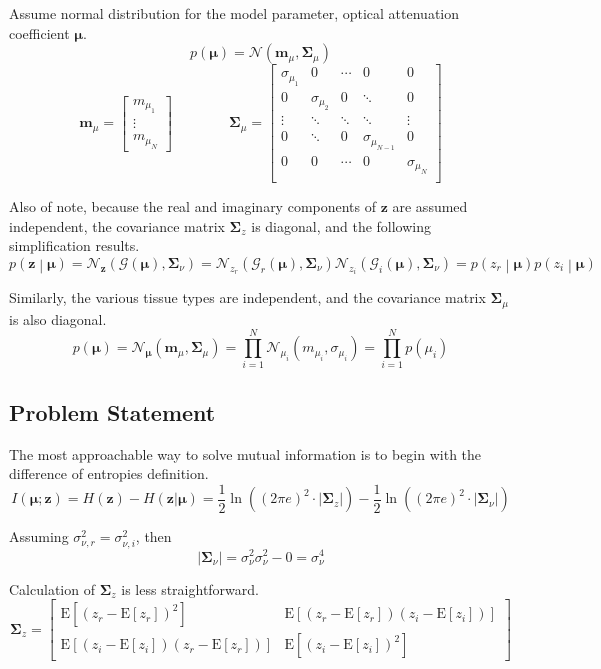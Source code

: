 \documentclass{article}         %
\theoremstyle{definition}
\theoremstyle{remark}
\newcommand{\eq}[1]{\begin{equation} #1 \end{equation}}
\newcommand{\mbf}{\mathbf{m}}
\newcommand{\zbf}{\mathbf{z}}
\newcommand{\mubf}{\boldsymbol{\mu}}
\newcommand{\Sigmabf}{\boldsymbol{\Sigma}}
\newcommand{\Gscript}{\mathcal{G}}
\newcommand{\Nscript}{\mathcal{N}}
\newcommand{\paren}[1]{\left(#1\right)}
\newcommand{\bracket}[1]{\left[#1\right]}
\newcommand{\arr}[2]{\begin{array}{#1} #2 \end{array}}
\newcommand{\brkarray}[2]{\bracket{\arr{#1}{#2}}}
\newcommand{\expect}[1]{\mathrm{E}\left[#1\right]}
\newcommand{\prodin}{\prod\limits_{i=1}^N}
\newcommand{\qq}{\qquad\qquad}
\begin{document}
Assume normal distribution for the model parameter, optical attenuation coefficient $\mubf$.
\eq{p\paren{\mubf} = \mathcal{N}\left(\mbf_\mu,\mathbf{\Sigma}_\mu\right)}
\eq{\mbf_\mu = \brkarray{c}{m_{\mu_1} \\ \vdots \\ m_{\mu_N}} \qq
\Sigmabf_\mu = \brkarray{ccccc}{
	\sigma_{\mu_1} & 0 & \cdots & 0 & 0 \\
	0 & \sigma_{\mu_2} & 0 & \ddots & 0 \\
	\vdots & \ddots & \ddots & \ddots & \vdots \\
	0 & \ddots & 0 & \sigma_{\mu_{N-1}} & 0 \\
	0 & 0 & \cdots & 0 & \sigma_{\mu_N} \\}}

Also of note, because the real and imaginary components of $\zbf$ are assumed independent, the covariance matrix $\Sigmabf_z$ is diagonal, and the following simplification results.
\eq{p\paren{\zbf\middle|\mubf} = \Nscript_\zbf\paren{\Gscript\paren{\mubf},\mathbf{\Sigma}_\nu} = \Nscript_{z_r}\paren{\Gscript_r\paren{\mubf},\mathbf{\Sigma}_\nu}
\Nscript_{z_i}\paren{\Gscript_i\paren{\mubf},\mathbf{\Sigma}_\nu} = p\paren{z_r\middle|\mubf}p\paren{z_i\middle|\mubf}}

Similarly, the various tissue types are independent, and the covariance matrix $\Sigmabf_\mu$ is also diagonal.
\eq{p\paren{\mubf} = \Nscript_{\mubf}\paren{\mbf_\mu,\Sigmabf_\mu} = \prodin\Nscript_{\mu_i}\paren{m_{\mu_i},\sigma_{\mu_i}} = \prodin p\paren{\mu_i}}

\subsection{Problem Statement}\label{Problem Statement}

The most approachable way to solve mutual information is to begin with the difference of entropies definition.
\eq{I\left(\mubf;\zbf\right) = H\left(\zbf\right) - H\left(\zbf|\mubf\right) 
= \frac{1}{2}\ln\left(\left(2\pi e\right)^2\cdot\lvert\mathbf{\Sigma}_z\rvert\right) - \frac{1}{2}\ln\left(\left(2\pi e\right)^2\cdot\lvert\mathbf{\Sigma}_\nu\rvert\right)}

Assuming $\sigma_{\nu,r}^2=\sigma_{\nu,i}^2$, then
\eq{\lvert\mathbf{\Sigma}_\nu\rvert = \sigma_\nu^2\sigma_\nu^2-0 = \sigma_\nu^4}

Calculation of $\mathbf{\Sigma}_z$ is less straightforward.
\eq{\mathbf{\Sigma}_z = \left[ \begin{array}{cc}
\mathrm{E}\left[\left(z_r - \expect{z_r}\right)^2\right] & \mathrm{E}\left[\left(z_r - \expect{z_r}\right)\left(z_i - \expect{z_i}\right)\right] \\
\mathrm{E}\left[\left(z_i - \expect{z_i}\right)\left(z_r - \expect{z_r}\right)\right] & \mathrm{E}\left[\left(z_i - \expect{z_i}\right)^2\right] \end{array} \right]}
\end{document}

